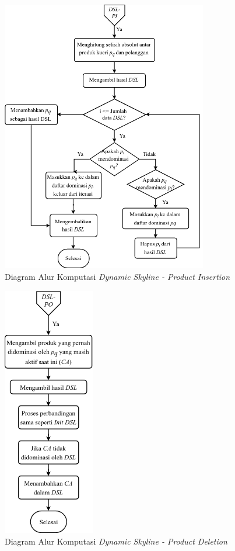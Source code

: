 \begin{figure}[H]
	\centering
	\includegraphics[width=9cm]{assets/img/bab3/flowchart-dsl-pi.png}
	\caption{Diagram Alur Komputasi \textit{Dynamic Skyline - Product  Insertion}}
	\label{fig:flowchart-dsl-pi}
\end{figure}

\begin{figure}[H]
	\centering
	\includegraphics[width=4cm]{assets/img/bab3/flowchart-dsl-pd.png}
	\caption{Diagram Alur Komputasi \textit{Dynamic Skyline - Product Deletion}}
	\label{fig:flowchart-dsl-pd}
\end{figure}

